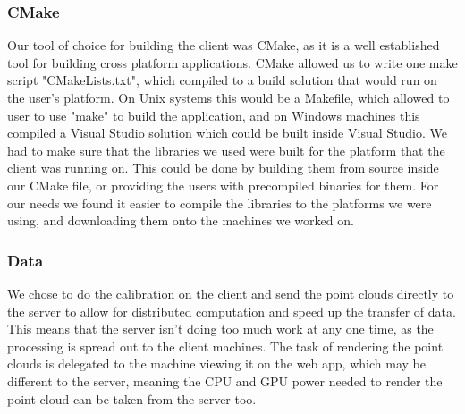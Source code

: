 \documentclass{article}
\begin{document}
\subsubsection{CMake}
Our tool of choice for building the client was CMake, as it is a well established tool for building cross platform applications. CMake allowed us to write one make script "CMakeLists.txt", which compiled to a build solution that would run on the user's platform. On Unix systems this would be a Makefile, which allowed to user to use "make" to build the application, and on Windows machines this compiled a Visual Studio solution which could be built inside Visual Studio. We had to make sure that the libraries we used were built for the platform that the client was running on. This could be done by building them from source inside our CMake file, or providing the users with precompiled binaries for them. For our needs we found it easier to compile the libraries to the platforms we were using, and downloading them onto the machines we worked on. 
\subsubsection{Data}
We chose to do the calibration on the client and send the point clouds directly to the server to allow for distributed computation and speed up the transfer of data. This means that the server isn't doing too much work at any one time, as the processing is spread out to the client machines. The task of rendering the point clouds is delegated to the machine viewing it on the web app, which may be different to the server, meaning the CPU and GPU power needed to render the point cloud can be taken from the server too.
\end{document}
